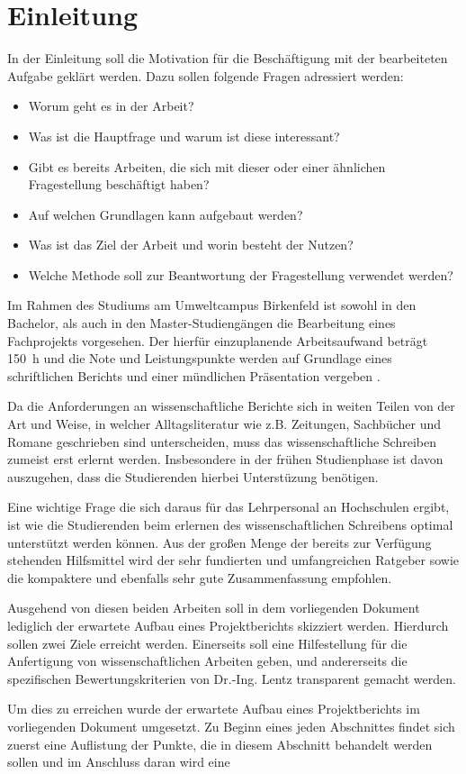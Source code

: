 \documentclass[12pt,a4paper]{scrartcl}
\begin{document}
\section{Einleitung}\label{sec:Einleitung}
%
In der Einleitung soll die Motivation für die Beschäftigung mit der bearbeiteten Aufgabe geklärt werden.
Dazu sollen folgende Fragen adressiert werden:
%
\begin{itemize}
\item Worum geht es in der Arbeit? 
\item Was ist die Hauptfrage und warum ist diese interessant?
\item Gibt es bereits Arbeiten, die sich mit dieser oder einer ähnlichen Fragestellung beschäftigt haben?
\item Auf welchen Grundlagen kann aufgebaut werden?
\item Was ist das Ziel der Arbeit und worin besteht der Nutzen?
\item Welche Methode soll zur Beantwortung der Fragestellung verwendet werden?
\end{itemize}
%
Im Rahmen des Studiums am Umweltcampus Birkenfeld ist sowohl in den Bachelor, als auch in den Master-Studiengängen die Bearbeitung eines Fachprojekts vorgesehen.
Der hierfür einzuplanende Arbeitsaufwand beträgt \SI{150}{\hour} und die Note und Leistungspunkte werden auf Grundlage eines schriftlichen Berichts und einer mündlichen Präsentation vergeben \cite{modulhandbuch}.
\par
Da die Anforderungen an wissenschaftliche Berichte sich in weiten Teilen von der Art und Weise, in welcher Alltagsliteratur wie z.B. Zeitungen, Sachbücher und Romane geschrieben sind unterscheiden, muss das wissenschaftliche Schreiben zumeist erst erlernt werden. 
Insbesondere in der frühen Studienphase ist davon auszugehen, dass die Studierenden hierbei Unterstüzung benötigen.
\par
Eine wichtige Frage die sich daraus für das Lehrpersonal an Hochschulen ergibt, ist wie die Studierenden beim erlernen des wissenschaftlichen Schreibens optimal unterstützt werden können.
Aus der großen Menge der bereits zur Verfügung stehenden Hilfsmittel wird der sehr fundierten und umfangreichen Ratgeber \cite{teHeesen} sowie die kompaktere und ebenfalls sehr gute Zusammenfassung \cite{Rumpler} empfohlen.
\par 
Ausgehend von diesen beiden Arbeiten soll in dem vorliegenden Dokument lediglich der erwartete Aufbau eines Projektberichts skizziert werden.
Hierdurch sollen zwei Ziele erreicht werden.
Einerseits soll eine Hilfestellung für die Anfertigung von wissenschaftlichen Arbeiten geben, und andererseits die spezifischen Bewertungskriterien von Dr.-Ing. Lentz transparent gemacht werden.
\par
Um dies zu erreichen wurde der erwartete Aufbau eines Projektberichts im vorliegenden Dokument umgesetzt.  
Zu Beginn eines jeden Abschnittes findet sich zuerst eine Auflistung der Punkte, die in diesem Abschnitt behandelt werden sollen und
im Anschluss daran wird eine 
\end{document}

